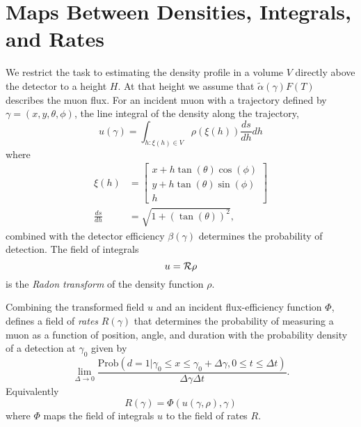 \documentclass[twocolumn]{article}
\newcommand{\Radon}{{\cal R}}
\begin{document}
\section{Maps Between Densities, Integrals, and Rates}
\label{sec:maps}

We restrict the task to estimating the density profile in a volume $V$
directly above the detector to a height $H$.  At that height we assume
that $\tilde \alpha(\gamma)F(T)$ describes the muon flux.  For an
incident muon with a trajectory defined by $\gamma =
(x,y,\theta,\phi)$, the line integral of the density along the
trajectory,
\begin{equation}
  \label{eq:u}
  u(\gamma) = \int_{h:\xi(h) \in V} \rho(\xi(h))  \frac{d s}{d h} dh
\end{equation}
where
\begin{align*}
  \xi(h) &= \begin{bmatrix}
    x + h \tan(\theta) \cos(\phi) \\
    y + h \tan(\theta) \sin(\phi) \\
    h
  \end{bmatrix} \\
  \frac{d s}{d h} &= \sqrt{1+(\tan(\theta))^2},
\end{align*}
combined with the detector efficiency $\beta(\gamma)$ determines the
probability of detection.  The field of integrals
\begin{equation*}
  u = \Radon \rho
\end{equation*}
is the \emph{Radon transform} of the density function $\rho$.

Combining the transformed field $u$ and an incident flux-efficiency
function $\Phi$, defines a field of \emph{rates} $R(\gamma)$ that
determines the probability of measuring a muon as a function of
position, angle, and duration with the probability density of a
detection at $\gamma_0$ given by
\begin{equation*}
  \lim_{\Delta \rightarrow 0} \frac{\text{Prob}(d=1|\gamma_0 \leq x
    \leq \gamma_0 + \Delta \gamma,0 \leq t \leq \Delta t)}{ \Delta
    \gamma \Delta t }.
\end{equation*}
Equivalently
\begin{equation*}
  R(\gamma) = \Phi(u(\gamma,\rho),\gamma)
\end{equation*}
where $\Phi$ maps the field of integrals $u$ to the field of rates
$R$.
\end{document}
